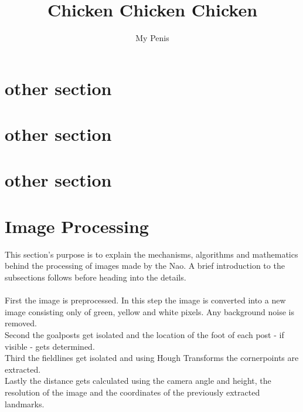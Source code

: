 \documentclass[twocolumn]{article}
\author{My Penis}
\title{Chicken Chicken Chicken}
\numberwithin{figure}{section}
\begin{document}
\maketitle

\section{other section}
\section{other section}
\section{other section}

\section{Image Processing}
This section's purpose is to explain the mechanisms, algorithms and mathematics behind the processing of images made by the Nao.
A brief introduction to the subsections follows before heading into the details.\\ \\
First the image is preprocessed. In this step the image is converted into a new image consisting only of green, yellow and white pixels. Any background noise is removed.\\
Second the goalposts get isolated and the location of the foot of each post - if visible - gets determined.\\
Third the fieldlines get isolated and using Hough Transforms the cornerpoints are extracted.\\
Lastly the distance gets calculated using the camera angle and height, the resolution of the image and the coordinates of the previously extracted landmarks.
\end{document}
